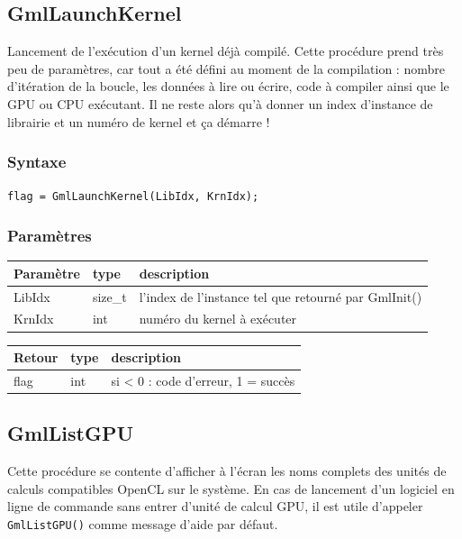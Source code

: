 \documentclass[a4paper,12pt]{article}
\begin{document}
\subsection{GmlLaunchKernel}

Lancement de l'exécution d'un kernel déjà compilé.
Cette procédure prend très peu de paramètres, car tout a été défini au moment de la compilation : nombre d'itération de la boucle, les données à lire ou écrire, code à compiler ainsi que le GPU ou CPU exécutant.
Il ne reste alors qu'à donner un index d'instance de librairie et un numéro de kernel et ça démarre !

\subsubsection*{Syntaxe}

{\tt flag = GmlLaunchKernel(LibIdx, KrnIdx);}

\subsubsection*{Paramètres}

\begin{tabular}{|m{2cm}|m{1.5cm}|m{10.5cm}|}
\hline
Paramètre  & type    & description \\
\hline
LibIdx     & size\_t & l'index de l'instance tel que retourné par GmlInit() \\
\hline
KrnIdx     & int     & numéro du kernel à exécuter \\
\hline
\end{tabular}

\medskip

\begin{tabular}{|m{2cm}|m{1.5cm}|m{10.5cm}|}
\hline
Retour     & type    & description \\
\hline
flag       & int     & si < 0 : code d'erreur, 1 = succès \\
\hline
\end{tabular}


\subsection{GmlListGPU}

Cette procédure se contente d'afficher à l'écran les noms complets des unités de calculs compatibles OpenCL sur le système.
En cas de lancement d'un logiciel en ligne de commande sans entrer d'unité de calcul GPU, il est utile d'appeler {\tt GmlListGPU()} comme message d'aide par défaut.
\end{document}
